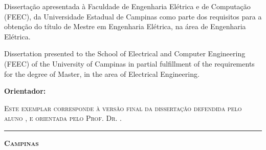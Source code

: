 {
\vspace{1cm}
\begin{flushright}
  \begin{minipage}[c]{.5\textwidth}
    Dissertação apresentada à Faculdade de Engenharia Elétrica e de Computação (FEEC), da Universidade Estadual de Campinas como parte dos requisitos para a obtenção do título de Mestre em Engenharia Elétrica, na área de Engenharia Elétrica.
  \end{minipage}
\end{flushright}

\begin{flushright}
  \begin{minipage}[c]{.5\textwidth}
Dissertation presented to the School of Electrical and Computer Engineering (FEEC) of the University of Campinas in partial fulfillment of the requirements for the degree of Master, in the area of Electrical Engineering. 
  \end{minipage}
\end{flushright}
\vspace{1cm}


\noindent
\textbf{Orientador: \orientador}
\vspace{.5cm}

\noindent
\begin{minipage}[c]{.5\textwidth}
  {\footnotesize\textsc{Este exemplar corresponde à versão final da dissertação
  defendida pelo aluno \autor, e orientada pelo Prof. Dr. \orientador.
  }}
\end{minipage}
\vspace{1cm}

\noindent
{
\vspace{1cm}
\noindent
\rule[1pt]{7cm}{.5pt}  %
}
\vspace{.5cm}
}








\begin{center}
  {\small\textbf{\textsc{ Campinas \\ \ano}}}
\end{center}


